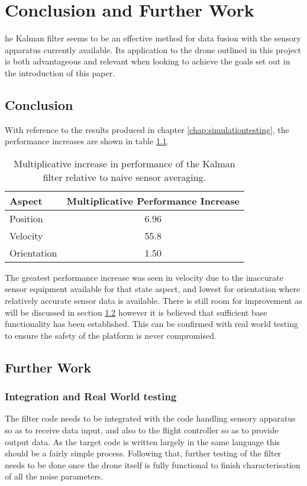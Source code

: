 \let\textcircled=\pgftextcircled
\chapter{Conclusion and Further Work}
\label{chap:conclusion}

he Kalman filter seems to be an effective method for data fusion with the sensory apparatus currently available. Its application to the drone outlined in this project is both advantageous and relevant when looking to achieve the goals set out in the introduction of this paper. 

\section{Conclusion}
With reference to the results produced in chapter \ref{chap:simulationtesting}, the performance increases are shown in table \ref{tab:conclusion}.

\begin{table}[ht]
\centering

\begin{tabular}{@{}lc@{}}
\toprule
Aspect      & Multiplicative Performance Increase \\ \midrule
Position    & 6.96                                \\
Velocity    & 55.8                                \\
Orientation & 1.50                                \\ \bottomrule
\end{tabular}
\caption{Multiplicative increase in performance of the Kalman filter relative to naive sensor averaging.}
\label{tab:conclusion}
\end{table}

The greatest performance increase was seen in velocity due to the inaccurate sensor equipment available for that state aspect, and lowest for orientation where relatively accurate sensor data is available. There is still room for improvement as will be discussed in section \ref{sec:furtherwork} however it is believed that sufficient base functionality has been established. This can be confirmed with real world testing to ensure the safety of the platform is never compromised.

\section{Further Work}
\label{sec:furtherwork}
\subsection{Integration and Real World testing}
The filter code needs to be integrated with the code handling sensory apparatus so as to receive data input, and also to the flight controller so as to provide output data. As the target code is written largely in the same language this should be a fairly simple process. Following that, further testing of the filter needs to be done once the drone itself is fully functional to finish characterisation of all the noise parameters.


